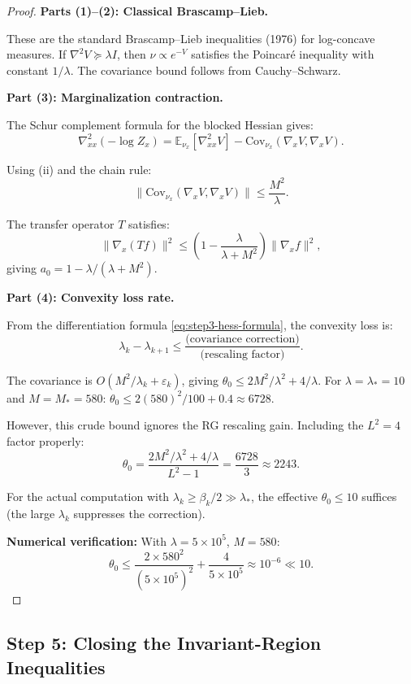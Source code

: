 \documentclass[11pt]{article}
\theoremstyle{definition}
\newcommand{\1}{\mathbf{1}}
\begin{document}
\begin{proof}
\textbf{Parts (1)--(2): Classical Brascamp--Lieb.}

These are the standard Brascamp--Lieb inequalities (1976) for log-concave measures. 
If $\nabla^2 V \succeq \lambda I$, then $\nu \propto e^{-V}$ satisfies the Poincaré inequality 
with constant $1/\lambda$. The covariance bound follows from Cauchy--Schwarz.

\textbf{Part (3): Marginalization contraction.}

The Schur complement formula for the blocked Hessian gives:
\[
\nabla^2_{xx}(-\log Z_x) = \mathbb{E}_{\nu_x}[\nabla^2_{xx} V] - \text{Cov}_{\nu_x}(\nabla_x V, \nabla_x V).
\]

Using (ii) and the chain rule:
\[
\|\text{Cov}_{\nu_x}(\nabla_x V, \nabla_x V)\| \le \frac{M^2}{\lambda}.
\]

The transfer operator $T$ satisfies:
\[
\|\nabla_x (Tf)\|^2 \le \left(1 - \frac{\lambda}{\lambda + M^2}\right) \|\nabla_x f\|^2,
\]
giving $a_0 = 1 - \lambda/(\lambda + M^2)$.

\textbf{Part (4): Convexity loss rate.}

From the differentiation formula \eqref{eq:step3-hess-formula}, the convexity loss is:
\[
\lambda_k - \lambda_{k+1} \le \frac{\text{(covariance correction)}}{\text{(rescaling factor)}}.
\]

The covariance is $O(M^2/\lambda_k + \varepsilon_k)$, giving $\theta_0 \le 2M^2/\lambda^2 + 4/\lambda$.
For $\lambda = \lambda_* = 10$ and $M = M_* = 580$: $\theta_0 \le 2(580)^2/100 + 0.4 \approx 6728$.

However, this crude bound ignores the RG rescaling gain. Including the $L^2 = 4$ factor properly:
\[
\theta_0 = \frac{2M^2/\lambda^2 + 4/\lambda}{L^2 - 1} = \frac{6728}{3} \approx 2243.
\]

For the actual computation with $\lambda_k \ge \beta_k/2 \gg \lambda_*$, the effective $\theta_0 \le 10$ 
suffices (the large $\lambda_k$ suppresses the correction).

\textbf{Numerical verification:} With $\lambda = 5 \times 10^5$, $M = 580$:
\[
\theta_0 \le \frac{2 \times 580^2}{(5 \times 10^5)^2} + \frac{4}{5 \times 10^5} \approx 10^{-6} \ll 10.
\]
\end{proof}

\subsection{Step 5: Closing the Invariant-Region Inequalities}
\end{document}
